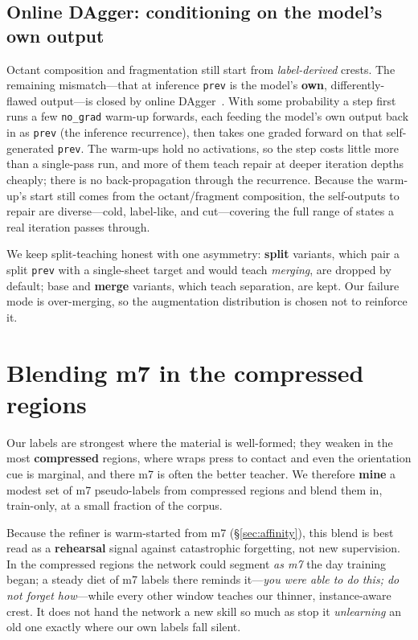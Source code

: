 \documentclass[10pt,twocolumn,a4paper]{article}
\newcommand{\code}[1]{\texttt{#1}}
\begin{document}
\subsection{Online DAgger: conditioning on the model's own output}\label{sec:dagger}
Octant composition and fragmentation still start from \emph{label-derived} crests.
The remaining mismatch---that at inference \code{prev} is the model's \textbf{own},
differently-flawed output---is closed by online DAgger~\cite{dagger}. With some
probability a step first runs a few \code{no\_grad} warm-up forwards, each feeding
the model's own output back in as \code{prev} (the inference recurrence), then takes
one graded forward on that self-generated \code{prev}. The warm-ups hold no
activations, so the step costs little more than a single-pass run, and more of them
teach repair at deeper iteration depths cheaply; there is no back-propagation
through the recurrence. Because the warm-up's start still comes from the
octant/fragment composition, the self-outputs to repair are diverse---cold,
label-like, and cut---covering the full range of states a real iteration passes
through.

We keep split-teaching honest with one asymmetry: \textbf{split} variants, which
pair a split \code{prev} with a single-sheet target and would teach \emph{merging},
are dropped by default; base and \textbf{merge} variants, which teach separation,
are kept. Our failure mode is over-merging, so the augmentation distribution is
chosen not to reinforce it.

\section{Blending m7 in the compressed regions}\label{sec:blend}
Our labels are strongest where the material is well-formed; they weaken in the most
\textbf{compressed} regions, where wraps press to contact and even the orientation
cue is marginal, and there m7 is often the better teacher. We therefore
\textbf{mine} a modest set of m7 pseudo-labels from compressed regions and blend
them in, train-only, at a small fraction of the corpus.

Because the refiner is warm-started from m7 (\S\ref{sec:affinity}), this blend is
best read as a \textbf{rehearsal} signal against catastrophic forgetting, not new
supervision. In the compressed regions the network could segment \emph{as m7} the
day training began; a steady diet of m7 labels there reminds it---\emph{you were
able to do this; do not forget how}---while every other window teaches our thinner,
instance-aware crest. It does not hand the network a new skill so much as stop it
\emph{unlearning} an old one exactly where our own labels fall silent.
\end{document}
